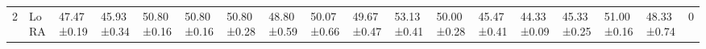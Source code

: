 \begin{table*}[t]
\begin{scriptsize}
{\begin{tabular}{c|l|l|l|l|l|l|l|l|l|l|l|l|l|l|l|l|c}
\multirow{5}{*}{2}  & LoRA                                   & 47.47±0.19                       & 45.93±0.34                       & 50.80±0.16                        & 50.80±0.16                        & 50.80±0.28                        & 48.80±0.59                        & 50.07±0.66                       & 49.67±0.47                       & 53.13±0.41                       & 50.00±0.28                        & 45.47±0.41                       & 44.33±0.09                       & 45.33±0.25                       & 51.00±0.16                        & 48.33±0.74                       & 0             \\ %

\end{tabular}}
\end{scriptsize}
\end{table*}
